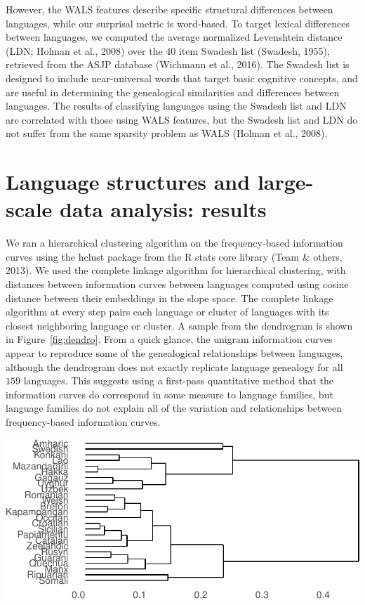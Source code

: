 \documentclass[man,floatsintext]{apa6}
\begin{document}
However, the WALS features describe specific structural differences between languages, while our surprisal metric is word-based. To target lexical differences between languages, we computed the average normalized Levenshtein distance (LDN; Holman et al., 2008) over the \(40\) item Swadesh list (Swadesh, 1955), retrieved from the ASJP database (Wichmann et al., 2016). The Swadesh list is designed to include near-universal words that target basic cognitive concepts, and are useful in determining the genealogical similarities and differences between languages. The results of classifying languages using the Swadesh list and LDN are correlated with those using WALS features, but the Swadesh list and LDN do not suffer from the same sparsity problem as WALS (Holman et al., 2008).

\hypertarget{language-structures-and-large-scale-data-analysis-results}{%
\section{Language structures and large-scale data analysis: results}\label{language-structures-and-large-scale-data-analysis-results}}

We ran a hierarchical clustering algorithm on the frequency-based information curves using the hclust package from the R stats core library (Team \& others, 2013). We used the complete linkage algorithm for hierarchical clustering, with distances between information curves between languages computed using cosine distance between their embeddings in the slope space. The complete linkage algorithm at every step pairs each language or cluster of languages with its closest neighboring language or cluster. A sample from the dendrogram is shown in Figure~\ref{fig:dendro}. From a quick glance, the unigram information curves appear to reproduce some of the genealogical relationships between languages, although the dendrogram does not exactly replicate language genealogy for all \(159\) languages. This suggests using a first-pass quantitative method that the information curves do correspond in some measure to language families, but language families do not explain all of the variation and relationships between frequency-based information curves.

\includegraphics{figs/dendro-1.pdf}
\end{document}
